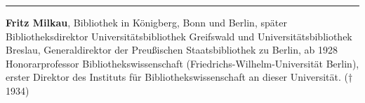 \begin{center}\rule{0.5\linewidth}{\linethickness}\end{center}

\textbf{Fritz Milkau}, Bibliothek in Königberg, Bonn und Berlin, später
Bibliotheksdirektor Universitätsbibliothek Greifswald und
Universitätsbibliothek Breslau, Generaldirektor der Preußischen
Staatsbibliothek zu Berlin, ab 1928 Honorarprofessor
Bibliothekswissenschaft (Friedrichs-Wilhelm-Universität Berlin), erster
Direktor des Instituts für Bibliothekswissenschaft an dieser
Universität. († 1934)
